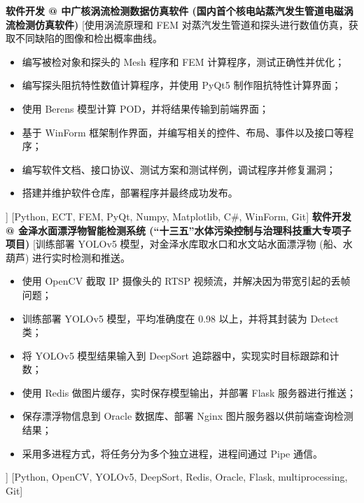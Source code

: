 \ifzh
    \begin{experiences}
        {\textbf{软件开发 @ 中广核涡流检测数据仿真软件 (国内首个核电站蒸汽发生管道电磁涡流检测仿真软件)}}%
        [使用涡流原理和 FEM 对蒸汽发生管道和探头进行数值仿真，获取不同缺陷的图像和检出概率曲线。
            \begin{itemize}
                \item {编写被检对象和探头的 Mesh 程序和 FEM 计算程序，测试正确性并优化；}
                \item {编写探头阻抗特性数值计算程序，并使用 PyQt5 制作阻抗特性计算界面；}
                \item {使用 Berens 模型计算 POD，并将结果传输到前端界面；}
                \item {基于 WinForm 框架制作界面，并编写相关的控件、布局、事件以及接口等程序；}
                \item {编写软件文档、接口协议、测试方案和测试样例，调试程序并修复漏洞；}
                \item {搭建并维护软件仓库，部署程序并最终成功发布。}
            \end{itemize}]
        [Python, ECT, FEM, PyQt, Numpy, Matplotlib, C\#, WinForm, Git]
        \separator{0.5ex}
        {\textbf{软件开发 @ 金泽水面漂浮物智能检测系统 (``十三五''水体污染控制与治理科技重大专项子项目)}}%
        [训练部署 YOLOv5 模型，对金泽水库取水口和水文站水面漂浮物 (船、水葫芦) 进行实时检测和推送。
            \begin{itemize}
                \item {使用 OpenCV 截取 IP 摄像头的 RTSP 视频流，并解决因为带宽引起的丢帧问题；}
                \item {训练部署 YOLOv5 模型，平均准确度在 0.98 以上，并将其封装为 Detect 类；}
                \item {将 YOLOv5 模型结果输入到 DeepSort 追踪器中，实现实时目标跟踪和计数；}
                \item {使用 Redis 做图片缓存，实时保存模型输出，并部署 Flask 服务器进行推送；}
                \item {保存漂浮物信息到 Oracle 数据库、部署 Nginx 图片服务器以供前端查询检测结果；}
                \item {采用多进程方式，将任务分为多个独立进程，进程间通过 Pipe 通信。}
            \end{itemize}]
        [Python, OpenCV, YOLOv5, DeepSort, Redis, Oracle, Flask, multiprocessing, Git]
    \end{experiences}
